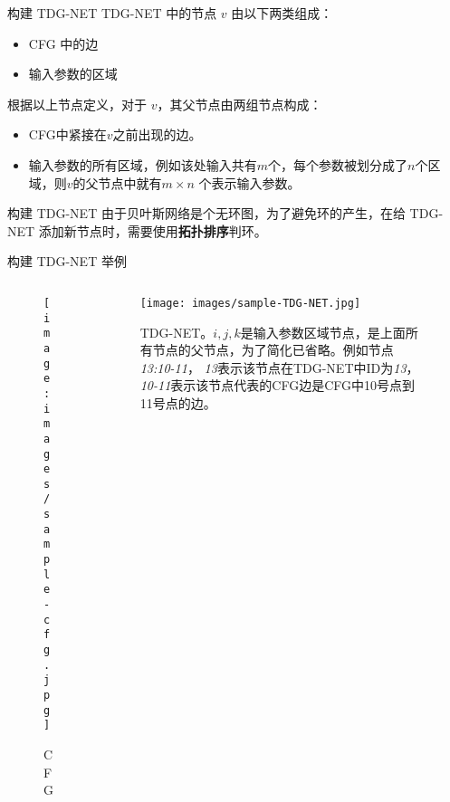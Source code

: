 \documentclass{beamer}
\begin{document}
    \begin{frame}{构建 TDG-NET}
        TDG-NET 中的节点 $v$ 由以下两类组成：

        \begin{block}{}
            \begin{itemize}
                \item CFG 中的边
                \item 输入参数的区域
            \end{itemize}
        \end{block}
        \pause

        根据以上节点定义，对于 $v$，其父节点由两组节点构成：
        \begin{block}{}
            \begin{itemize}
                \item CFG中紧接在$v$之前出现的边。
                \item 输入参数的所有区域，例如该处输入共有$m$个，每个参数被划分成了$n$个区域，则$v$的父节点中就有$m\times n$ 个表示输入参数。
            \end{itemize}
        \end{block}
    \end{frame}

    \begin{frame}{构建 TDG-NET}
        由于贝叶斯网络是个无环图，为了避免环的产生，在给 TDG-NET 添加新节点时，需要使用\textbf{拓扑排序}判环。
    \end{frame}

    \begin{frame}{构建 TDG-NET 举例}
        \begin{columns}[T]
            \begin{column}{.35\textwidth}
                \begin{figure}[!ht]
                    \centering
                    \texttt{[image: images/sample-cfg.jpg]}
                    \caption{CFG}
                \end{figure}
            \end{column}
            \begin{column}{.63\textwidth}
                \begin{figure}[!ht]
                    \centering
                    \texttt{[image: images/sample-TDG-NET.jpg]}
                    \caption{TDG-NET。$i,j,k$是输入参数区域节点，是上面所有节点的父节点，为了简化已省略。例如节点\textit{13:10-11}，
                             \textit{13}表示该节点在TDG-NET中ID为\textit{13}，\textit{10-11}表示该节点代表的CFG边是CFG中10号点到
                             11号点的边。}
                \end{figure}
            \end{column}
        \end{columns}   
    \end{frame}
\end{document}
